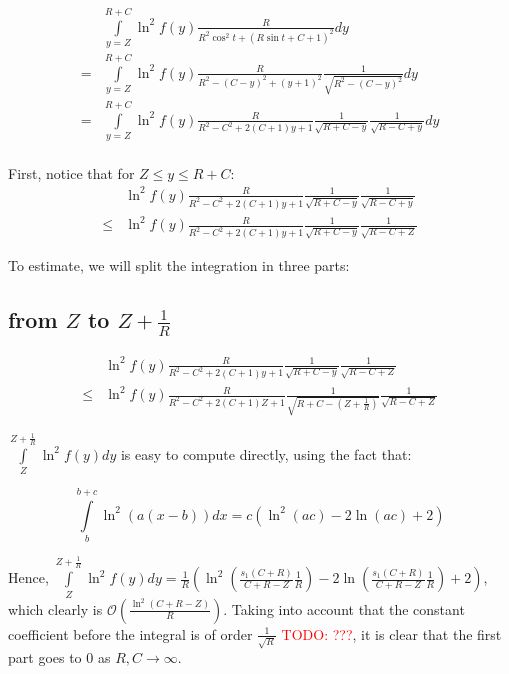 \documentclass[12pt, a4paper]{article}
\newcommand{\mcO}{\mathcal{O}}
\newcommand{\todo}[1]{{\large \textcolor{red}{TODO: #1}}}
\begin{document}
\begin{align*}
    & \int\limits_{y = Z}^{R + C} \ln^2 f(y) \frac{R}{R^2 \cos^2 t + (R \sin t + C + 1)^2} dy \\
=   & \int\limits_{y = Z}^{R + C} \ln^2 f(y) \frac{R}{R^2 - (C - y)^2 + (y + 1)^2} \frac{1}{\sqrt{R^2 - (C - y)^2}} dy\\
=   & \int\limits_{y = Z}^{R + C} \ln^2 f(y) \frac{R}{R^2 - C^2 + 2 (C + 1) y + 1} \frac{1}{\sqrt{R + C - y}} \frac{1}{\sqrt{R - C + y}}  dy\\
\end{align*}

First, notice that for $Z \le y \le R + C$:
\begin{align*}
    & \ln^2 f(y) \frac{R}{R^2 - C^2 + 2 (C + 1) y + 1} \frac{1}{\sqrt{R + C - y}} \frac{1}{\sqrt{R - C + y}} \\
\le & \ln^2 f(y) \frac{R}{R^2 - C^2 + 2 (C + 1) y + 1} \frac{1}{\sqrt{R + C - y}} \frac{1}{\sqrt{R - C + Z}}
\end{align*}


To estimate, we will split the integration in three parts:

\subsection*{from $Z$ to $Z + \frac{1}{R}$}

\begin{align*}
       & \ln^2 f(y) \frac{R}{R^2 - C^2 + 2 (C + 1) y + 1} \frac{1}{\sqrt{R + C - y}} \frac{1}{\sqrt{R - C + Z}}
\\ \le & \ln^2 f(y) \frac{R}{R^2 - C^2 + 2 (C + 1) Z + 1} \frac{1}{\sqrt{R + C - (Z + \frac{1}{R})}} \frac{1}{\sqrt{R - C + Z}}
\end{align*}

$\int\limits_{Z}^{Z + \frac{1}{R}} \ln^2 f(y) dy$ is easy to compute directly, using the fact that:

\[
    \int\limits_b^{b + c} \ln^2 (a (x - b)) dx = c (\ln^2(a c) - 2 \ln (a c) + 2)
\]

Hence, $\int\limits_{Z}^{Z + \frac{1}{R}} \ln^2 f(y) dy = \frac{1}{R} ( \ln^2 (\frac{s_1(C + R)}{C + R - Z} \frac{1}{R}) - 2 \ln (\frac{s_1(C + R)}{C + R - Z} \frac{1}{R}) + 2)$, which clearly is $\mcO(\frac{\ln^2(C + R - Z)}{R})$. Taking into account that the constant coefficient before the integral is of order $\frac{1}{\sqrt{R}}$ \todo{???}, it is clear that the first part goes to $0$ as $R, C \to \infty$.
\end{document}
